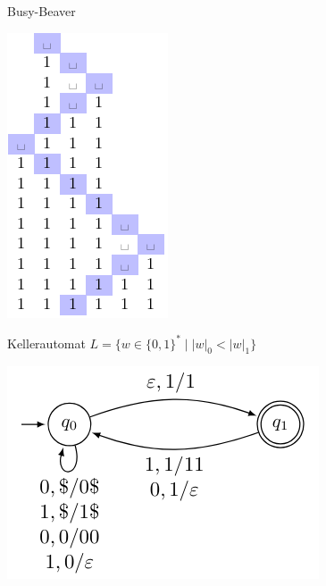 \begin{example2}{Busy-Beaver}
\begin{minipage}{0.25\linewidth}
        \vspace{1mm}

        \includegraphics[width=1\linewidth]{images/busybeaverband.png}
    \end{minipage}
\end{example2}

\begin{example2}{Kellerautomat} $L=\{w \in \{0,1\}^{*} \mid |w|_0 < |w|_1\}$

    \includegraphics[width=0.4\linewidth]{images/KA_bsp.png}
    
\end{example2}

